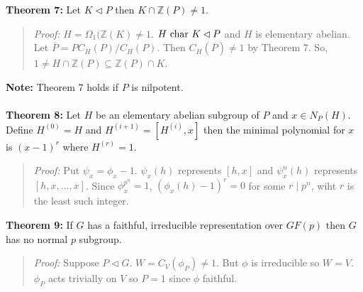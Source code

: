 {\bf Theorem 7:} Let $K \lhd P$ then $K \cap {\mathbb Z}(P) \ne 1$.
\begin{quote}
\emph{Proof:}
$H= \Omega_1({\mathbb Z}(K) \ne 1$.  $H \textnormal{ char } K \lhd P$ and $H$ is elementary
abelian. Let ${\overline P} = P C_H(P) / C_H(P)$.  Then $C_H({\overline P}) \ne 1$ by Theorem 7.
So, $1 \ne H \cap {\mathbb Z}(P) \subseteq {\mathbb Z}(P) \cap K$.
\end{quote}
{\bf Note:} Theorem 7 holds if $P$ is nilpotent.
\\
\\
{\bf Theorem 8:}  Let $H$ be an elementary abelian subgroup of $P$ and $x \in N_P(H)$.  Define
$H^{(0)} = H$ and $H^{(i+1)}= [H^{(i)}, x]$ then the minimal polynomial for $x$ is $(x-1)^r$
where $H^{(r)}=1$.
\begin{quote}
\emph{Proof:}
Put $\psi_x= \phi_x -1$. $\psi_x(h)$ represents $[h, x]$ and $\psi_x^n(h)$ represents $[h,x,\ldots,x]$.
Since $\phi_x^{p^n} = 1$, $(\phi_x(h) - 1)^r = 0$ for some $r \mid p^n$, wiht $r$ is the least such integer.
\end{quote}
{\bf Theorem 9:} If $G$ has a faithful, irreducible representation over $GF(p)$ then $G$
has no normal $p$ subgroup.
\begin{quote}
\emph{Proof:}
Suppose $P \lhd G$.  $W= C_V(\phi_{P}) \ne 1$.  But $\phi$ is irreducible so $W=V$.  $\phi_{P}$
acts trivially on $V$ so $P=1$ since $\phi$ faithful.
\end{quote}

